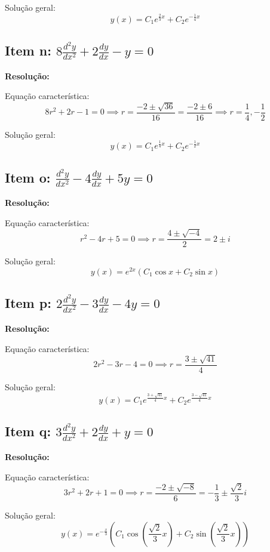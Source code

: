 \documentclass[12pt,a4paper]{article}
\begin{document}
Solução geral:
\[
\boxed{y(x) = C_1 e^{\frac{2}{3}x} + C_2 e^{-\frac{1}{4}x}}
\]

\subsection*{Item n: \(8 \frac{d^2 y}{dx^2} + 2 \frac{dy}{dx} - y = 0\)}

\textbf{Resolução:}

Equação característica:
\[
8r^2 + 2r - 1 = 0 \implies r = \frac{-2 \pm \sqrt{36}}{16} = \frac{-2 \pm 6}{16} \implies r = \frac{1}{4}, -\frac{1}{2}
\]

Solução geral:
\[
\boxed{y(x) = C_1 e^{\frac{1}{4}x} + C_2 e^{-\frac{1}{2}x}}
\]

\subsection*{Item o: \(\frac{d^2 y}{dx^2} - 4 \frac{dy}{dx} + 5y = 0\)}

\textbf{Resolução:}

Equação característica:
\[
r^2 - 4r + 5 = 0 \implies r = \frac{4 \pm \sqrt{-4}}{2} = 2 \pm i
\]

Solução geral:
\[
\boxed{y(x) = e^{2x}\left(C_1 \cos x + C_2 \sin x\right)}
\]

\subsection*{Item p: \(2 \frac{d^2 y}{dx^2} - 3 \frac{dy}{dx} - 4y = 0\)}

\textbf{Resolução:}

Equação característica:
\[
2r^2 - 3r - 4 = 0 \implies r = \frac{3 \pm \sqrt{41}}{4}
\]

Solução geral:
\[
\boxed{y(x) = C_1 e^{\frac{3 + \sqrt{41}}{4}x} + C_2 e^{\frac{3 - \sqrt{41}}{4}x}}
\]

\subsection*{Item q: \(3 \frac{d^2 y}{dx^2} + 2 \frac{dy}{dx} + y = 0\)}

\textbf{Resolução:}

Equação característica:
\[
3r^2 + 2r + 1 = 0 \implies r = \frac{-2 \pm \sqrt{-8}}{6} = -\frac{1}{3} \pm \frac{\sqrt{2}}{3}i
\]

Solução geral:
\[
\boxed{y(x) = e^{-\frac{x}{3}}\left(C_1 \cos\left(\frac{\sqrt{2}}{3}x\right) + C_2 \sin\left(\frac{\sqrt{2}}{3}x\right)\right)}
\]
\end{document}
